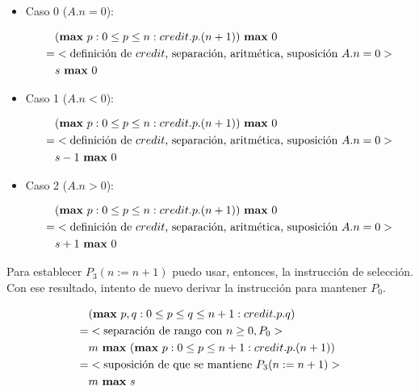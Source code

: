 \documentclass{article}
\begin{document}
\begin{itemize}
 \item Caso 0 ($A.n = 0$):

 \begin{align*}
  & (\text{{\bf max} } p : 0 \leq p \leq n : credit.p.(n+1)) \text{ {\bf max} } 0 \\
  = & <\text{definición de } credit \text{, separación, aritmética, suposición } A.n = 0> \\
  & s \text{ {\bf max} } 0 \\
 \end{align*}

 \item Caso 1 ($A.n < 0$):

 \begin{align*}
  & (\text{{\bf max} } p : 0 \leq p \leq n : credit.p.(n+1)) \text{ {\bf max} } 0 \\
  = & <\text{definición de } credit \text{, separación, aritmética, suposición } A.n = 0> \\
  & s-1 \text{ {\bf max} } 0 \\
 \end{align*}

 \item Caso 2 ($A.n > 0$):

 \begin{align*}
  & (\text{{\bf max} } p : 0 \leq p \leq n : credit.p.(n+1)) \text{ {\bf max} } 0 \\
  = & <\text{definición de } credit \text{, separación, aritmética, suposición } A.n = 0> \\
  & s+1 \text{ {\bf max} } 0 \\
 \end{align*}

\end{itemize}

Para establecer $P_3(n := n + 1)$ puedo usar, entonces, la instrucción de selección. Con ese resultado,
intento de nuevo derivar la instrucción para mantener $P_0$.

\begin{align*}
 & (\text{{\bf max} } p, q : 0 \leq p \leq q \leq n + 1 : credit.p.q) \\
 = & <\text{separación de rango con } n \geq 0, P_0> \\
 & m \text{ {\bf max} } (\text{{\bf max} } p : 0 \leq p \leq n + 1 : credit.p.(n+1)) \\
 = & <\text{suposición de que se mantiene } P_3(n := n+1)> \\
 & m \text{ {\bf max} } s \\
\end{align*}
\end{document}
